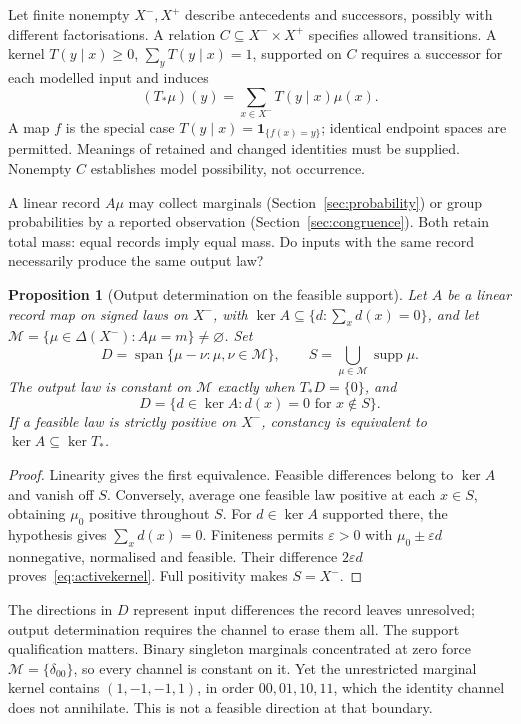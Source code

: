 \documentclass[11pt]{article}
\newtheorem{proposition}[theorem]{Proposition}
\newcommand{\cM}{\mathcal M}
\newcommand{\supp}{\operatorname{supp}}
\newcommand{\Span}{\operatorname{span}}
\newcommand{\ind}{\mathbf 1}
\begin{document}
Let finite nonempty $X^-,X^+$ describe antecedents and successors, possibly with different factorisations. A relation $C\subseteq X^-\times X^+$ specifies allowed transitions. A kernel $T(y\mid x)\geq0$, $\sum_yT(y\mid x)=1$, supported on $C$ requires a successor for each modelled input and induces
\begin{equation}\label{eq:pushforward}
(T_*\mu)(y)=\sum_{x\in X^-}T(y\mid x)\mu(x).
\end{equation}
A map $f$ is the special case $T(y\mid x)=\ind_{\{f(x)=y\}}$; identical endpoint spaces are permitted. Meanings of retained and changed identities must be supplied. Nonempty $C$ establishes model possibility, not occurrence.

A linear record $A\mu$ may collect marginals (Section~\ref{sec:probability}) or group probabilities by a reported observation (Section~\ref{sec:congruence}). Both retain total mass: equal records imply equal mass. Do inputs with the same record necessarily produce the same output law?

\begin{proposition}[Output determination on the feasible support]\label{prop:channel}
Let $A$ be a linear record map on signed laws on $X^-$, with $\ker A\subseteq\{d:\sum_xd(x)=0\}$, and let $\cM=\{\mu\in\Delta(X^-):A\mu=m\}\ne\varnothing$. Set
\begin{equation}\label{eq:directions}
D=\Span\{\mu-\nu:\mu,\nu\in\cM\},\qquad
S=\bigcup_{\mu\in\cM}\supp\mu.
\end{equation}
The output law is constant on $\cM$ exactly when $T_*D=\{0\}$, and
\begin{equation}\label{eq:activekernel}
D=\{d\in\ker A:d(x)=0\text{ for }x\notin S\}.
\end{equation}
If a feasible law is strictly positive on $X^-$, constancy is equivalent to $\ker A\subseteq\ker T_*$.
\end{proposition}
\begin{proof}
Linearity gives the first equivalence. Feasible differences belong to $\ker A$ and vanish off $S$. Conversely, average one feasible law positive at each $x\in S$, obtaining $\mu_0$ positive throughout $S$. For $d\in\ker A$ supported there, the hypothesis gives $\sum_xd(x)=0$. Finiteness permits $\varepsilon>0$ with $\mu_0\pm\varepsilon d$ nonnegative, normalised and feasible. Their difference $2\varepsilon d$ proves~\eqref{eq:activekernel}. Full positivity makes $S=X^-$.
\end{proof}
The directions in $D$ represent input differences the record leaves unresolved; output determination requires the channel to erase them all. The support qualification matters. Binary singleton marginals concentrated at zero force $\cM=\{\delta_{00}\}$, so every channel is constant on it. Yet the unrestricted marginal kernel contains $(1,-1,-1,1)$, in order $00,01,10,11$, which the identity channel does not annihilate. This is not a feasible direction at that boundary.
\end{document}
